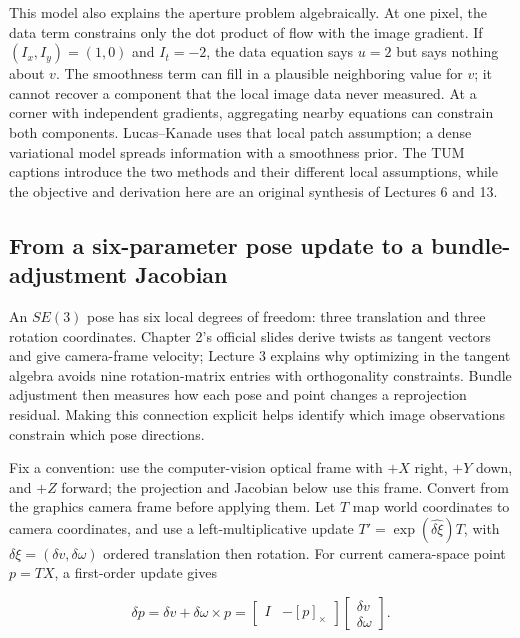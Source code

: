 This model also explains the aperture problem algebraically. At one pixel, the data term constrains only the dot product of flow with the image gradient. If \((I_x,I_y)=(1,0)\) and \(I_t=-2\), the data equation says \(u=2\) but says nothing about \(v\). The smoothness term can fill in a plausible neighboring value for \(v\); it cannot recover a component that the local image data never measured. At a corner with independent gradients, aggregating nearby equations can constrain both components. Lucas--Kanade uses that local patch assumption; a dense variational model spreads information with a smoothness prior. The TUM captions introduce the two methods and their different local assumptions, while the objective and derivation here are an original synthesis of Lectures 6 and 13.

\subsection{From a six-parameter pose update to a bundle-adjustment Jacobian}\label{02-foundations-ii-ch036-from-a-six-parameter-pose-update-to-a-bundle-adjustment-jacobian}

An \(SE(3)\) pose has six local degrees of freedom: three translation and three rotation coordinates. Chapter 2's official slides derive twists as tangent vectors and give camera-frame velocity; Lecture 3 explains why optimizing in the tangent algebra avoids nine rotation-matrix entries with orthogonality constraints. Bundle adjustment then measures how each pose and point changes a reprojection residual. Making this connection explicit helps identify which image observations constrain which pose directions.

Fix a convention: use the computer-vision optical frame with \(+X\) right, \(+Y\) down, and \(+Z\) forward; the projection and Jacobian below use this frame. Convert from the graphics camera frame before applying them. Let \(T\) map world coordinates to camera coordinates, and use a left-multiplicative update \(T'=\exp(\widehat{\delta\xi})T\), with \(\delta\xi=(\delta v,\delta\omega)\) ordered translation then rotation. For current camera-space point \(p=TX\), a first-order update gives

\[
\delta p=\delta v+\delta\omega\times p
=\begin{bmatrix}I&-[p]_\times\end{bmatrix}
\begin{bmatrix}\delta v\\\delta\omega\end{bmatrix}.
\]

